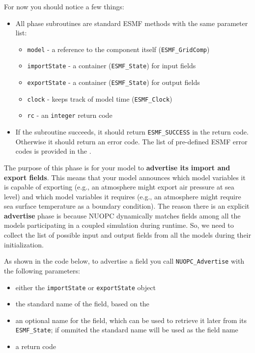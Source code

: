    For now you should notice a few things:
   \begin{itemize}
   \item All phase subroutines are standard ESMF methods with the same parameter list:
     \begin{itemize}
     \item {\tt model} - a reference to the component itself ({\tt ESMF\_GridComp})
     \item {\tt importState} - a container ({\tt ESMF\_State}) for input fields
     \item {\tt exportState} - a container ({\tt ESMF\_State}) for output fields
     \item {\tt clock} - keeps track of model time ({\tt ESMF\_Clock})
     \item {\tt rc} - an {\tt integer} return code
     \end{itemize}
   \item If the subroutine succeeds, it should return {\tt ESMF\_SUCCESS} in
    the return code.  Otherwise it should return an error code. The
    list of pre-defined ESMF error codes is provided in the
    .
  \end{itemize}
 
   The purpose of this phase is for your model to \textbf{advertise its import and
   export fields}.  This means that your model announces which model variables
   it is capable of exporting (e.g., an atmosphere might export air pressure at sea level)
   and which model variables it requires (e.g., an atmosphere might require
   sea surface temperature as a boundary condition).  The reason there is an
   explicit \textbf{advertise} phase is because NUOPC dynamically matches fields among
   all the models participating in a coupled simulation during runtime. So, we
   need to collect the list of possible input and output fields from all the
   models during their initialization.
  
   As shown in the code below, to advertise a field you call
   {\tt NUOPC\_Advertise} with the following parameters:
   \begin{itemize}
   \item either the {\tt importState} or {\tt exportState} object
   \item the standard name of the field, based on the
   \item an optional name for the field, which can be used to
    retrieve it later from its {\tt ESMF\_State}; if ommited
    the standard name will be used as the field name
   \item a return code
  \end{itemize}
  
